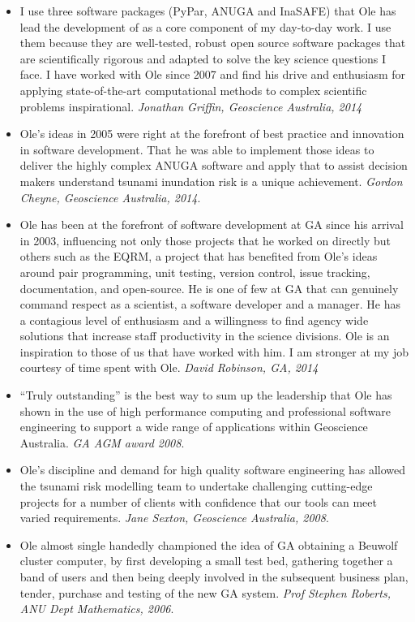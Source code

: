 \documentclass[11pt,a4paper]{article}
\begin{document}
\begin{itemize}
  \item I use three software packages (PyPar, ANUGA and InaSAFE) that Ole has lead the development of as a core component of my day-to-day work. I use them because they are well-tested, robust open source software packages that are scientifically rigorous and adapted to solve the key science questions I face. I have worked with Ole since 2007 and find his drive and enthusiasm for applying state-of-the-art computational methods to complex scientific problems inspirational. \emph{Jonathan Griffin, Geoscience Australia, 2014}
  \item Ole’s ideas in 2005 were right at the forefront of best practice and innovation in software development. That he was able to implement those ideas to deliver the highly complex ANUGA software and apply that to assist decision makers understand tsunami inundation risk is a unique achievement. \emph{Gordon Cheyne, Geoscience Australia, 2014}.
  \item Ole has been at the forefront of software development at GA since his arrival in 2003, influencing not only those projects that he worked on directly but others such as the EQRM, a project that has benefited from Ole’s ideas around pair programming, unit testing, version control, issue tracking, documentation, and open-source. He is one of few at GA that can genuinely command respect as a scientist, a software developer and a manager.  He has a contagious level of enthusiasm and a willingness to find agency wide solutions that increase staff productivity in the science divisions. Ole is an inspiration to those of us that have worked with him. I am stronger at my job courtesy of time spent with Ole. \emph{David Robinson, GA, 2014}
  \item “Truly outstanding” is the best way to sum up the leadership that Ole has shown in the use of high performance computing and professional software engineering to support a wide range of applications within Geoscience Australia. \emph{GA AGM award 2008}.
  \item Ole’s discipline and demand for high quality software engineering has allowed the tsunami risk modelling team to undertake challenging cutting-edge projects for a number of clients with confidence that our tools can meet varied requirements. \emph{Jane Sexton, Geoscience Australia, 2008}.
  \item Ole almost single handedly championed the idea of GA obtaining a Beuwolf cluster computer, by first developing a small test bed, gathering together a band of users and then being deeply involved in the subsequent business plan, tender, purchase and testing of the new GA system. \emph{Prof Stephen Roberts, ANU Dept Mathematics, 2006}.

\end{itemize}
\end{document}
